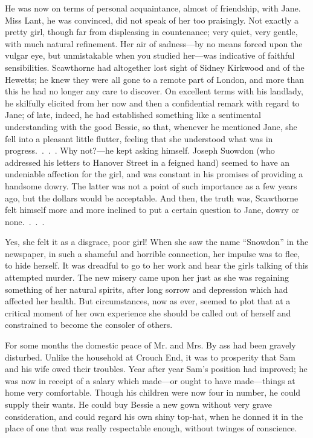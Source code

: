 He was now on terms of personal acquaintance, almost of friendship, with
Jane. Miss Lant, he was convinced, did not speak of her too praisingly.
Not exactly a pretty girl, though far from displeasing in countenance;
very quiet, very gentle, with much natural refinement. Her air of
sadness---by no means forced upon the vulgar eye, but unmistakable when
you studied her---was indicative of faithful sensibilities. Scawthorne
had altogether lost sight of Sidney Kirkwood and of the Hewetts; he knew
they were all gone to a remote part of London, and more than this he had
no longer any care to discover. On excellent terms with his landlady, he
skilfully elicited from her now and then a confidential remark with
regard to Jane; of late, indeed, he had established something like a
sentimental understanding with the good Bessie, so that, whenever he
mentioned Jane, she fell into a pleasant little flutter, feeling that
{}she understood what was in progress{.~.~.~.} Why not?---he kept asking
himself. Joseph Suowdon (who addressed his letters to Hanover Street in
a feigned hand) seemed to have an undeniable affection for the girl, and
was constant in his promises of providing a handsome dowry. The latter
was not a point of such importance as a few years ago, but the dollars
would be acceptable. And then, the truth was, Scawthorne felt himself
more and more inclined to put a certain question to Jane, dowry or
none{.~.~.~.}

Yes, she felt it as a disgrace, poor girl! When she saw the name
``Snowdon'' in the newspaper, in such a shameful and horrible
connection, her impulse was to flee, to hide herself. It was dreadful to
go to her work and hear the girls talking of this attempted murder. The
new misery came upon her just as she was regaining something of her
natural spirits, after long sorrow and depression which had affected her
health. But circumstances, now as ever, seemed to plot that at a
critical moment of her own experience she should be called out of
herself and constrained to become the consoler of others.

{}For some months the domestic peace of Mr. and Mrs. By ass had been
gravely disturbed. Unlike the household at Crouch End, it was to
prosperity that Sam and his wife owed their troubles. Year after year
Sam's position had improved; he was now in receipt of a salary which
made---or ought to have made---things at home very comfortable. Though
his children were now four in number, he could supply their wants. He
could buy Bessie a new gown without very grave consideration, and could
regard his own shiny top-hat, when he donned it in the place of one that
was really respectable enough, without twinges of conscience.

